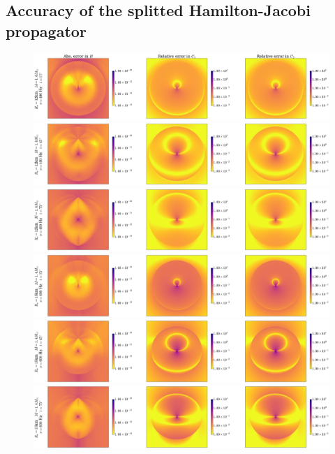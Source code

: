 \documentclass[iop, usenatbib]{emulateapj}
\begin{document}
\subsection{Accuracy of the splitted Hamilton-Jacobi propagator}

\begin{figure}
\centering
\includegraphics[width=16cm]{figs/popiha/fig_casual_15.pdf}
\includegraphics[width=16cm]{figs/popiha/fig_casual_45.pdf}
\includegraphics[width=16cm]{figs/popiha/fig_casual_75.pdf}
\includegraphics[width=16cm]{figs/popiha/fig_extreme_15.pdf}
\includegraphics[width=16cm]{figs/popiha/fig_extreme_45.pdf}
\includegraphics[width=16cm]{figs/popiha/fig_extreme_75.pdf}

\end{figure}
\end{document}
